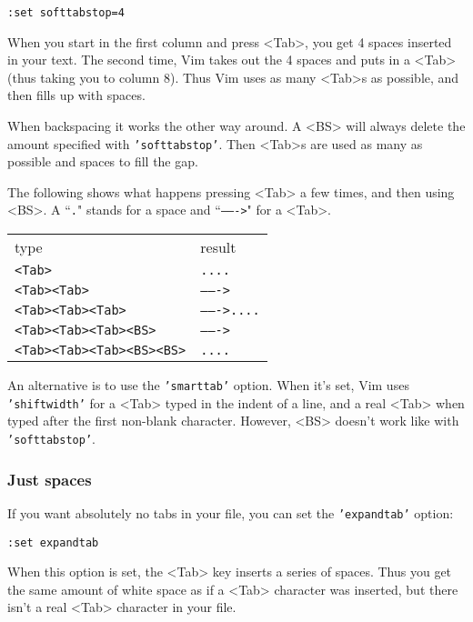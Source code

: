 \begin{Verbatim}[samepage=true]
 :set softtabstop=4
\end{Verbatim}

When you start in the first column and press <Tab>, you get 4 spaces inserted in your text.
The second time, Vim takes out the 4 spaces and puts in a <Tab> (thus taking you to column 8).
Thus Vim uses as many <Tab>s as possible, and then fills up with spaces.

When backspacing it works the other way around.
A <BS> will always delete the amount specified with \texttt{'softtabstop'}.
Then <Tab>s are used as many as possible and spaces to fill the gap.

The following shows what happens pressing <Tab> a few times, and then using <BS>.
A ``\texttt{.}" stands for a space and ``\texttt{------->}" for a <Tab>.

\begin{center} \begin{tabular}{l l}
type & result \\
\texttt{<Tab>} & \texttt{....} \\
\texttt{<Tab><Tab>} & \texttt{------->} \\
\texttt{<Tab><Tab><Tab>} & \texttt{------->....} \\
\texttt{<Tab><Tab><Tab><BS>} & \texttt{------->} \\
\texttt{<Tab><Tab><Tab><BS><BS>} & \texttt{....} \\
\end{tabular} \end{center}

An alternative is to use the \texttt{'smarttab'} option.
When it's set, Vim uses \texttt{'shiftwidth'} for a <Tab> typed in the indent of a line, and a real <Tab> when typed after the first non-blank character.
However, <BS> doesn't work like with \texttt{'softtabstop'}.

\subsubsection{Just spaces}
If you want absolutely no tabs in your file, you can set the \texttt{'expandtab'} option:

\begin{Verbatim}[samepage=true]
 :set expandtab
\end{Verbatim}

When this option is set, the <Tab> key inserts a series of spaces.
Thus you get the same amount of white space as if a <Tab> character was inserted, but there isn't a real <Tab> character in your file.


